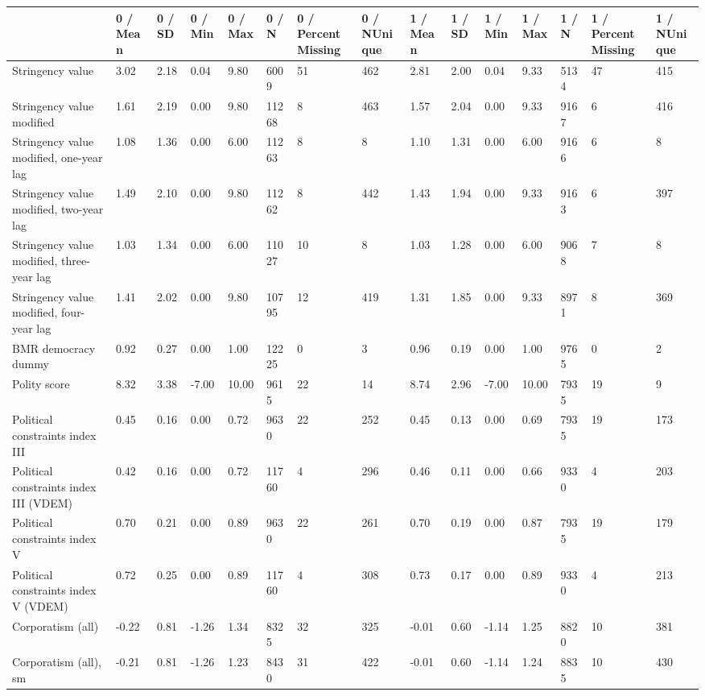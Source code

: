 
\begin{longtable}{lllllllllllllll}
\toprule
  & 0 / Mean & 0 / SD & 0 / Min & 0 / Max & 0 / N & 0 / PercentMissing & 0 / NUnique & 1 / Mean & 1 / SD & 1 / Min & 1 / Max & 1 / N & 1 / PercentMissing & 1 / NUnique\\
\midrule
Stringency value & 3.02 & 2.18 & 0.04 & 9.80 & 6009 & 51 & 462 & 2.81 & 2.00 & 0.04 & 9.33 & 5134 & 47 & 415\\
Stringency value modified & 1.61 & 2.19 & 0.00 & 9.80 & 11268 & 8 & 463 & 1.57 & 2.04 & 0.00 & 9.33 & 9167 & 6 & 416\\
Stringency value modified, one-year lag & 1.08 & 1.36 & 0.00 & 6.00 & 11263 & 8 & 8 & 1.10 & 1.31 & 0.00 & 6.00 & 9166 & 6 & 8\\
Stringency value modified, two-year lag & 1.49 & 2.10 & 0.00 & 9.80 & 11262 & 8 & 442 & 1.43 & 1.94 & 0.00 & 9.33 & 9163 & 6 & 397\\
Stringency value modified, three-year lag & 1.03 & 1.34 & 0.00 & 6.00 & 11027 & 10 & 8 & 1.03 & 1.28 & 0.00 & 6.00 & 9068 & 7 & 8\\
\addlinespace
Stringency value modified, four-year lag & 1.41 & 2.02 & 0.00 & 9.80 & 10795 & 12 & 419 & 1.31 & 1.85 & 0.00 & 9.33 & 8971 & 8 & 369\\
BMR democracy dummy & 0.92 & 0.27 & 0.00 & 1.00 & 12225 & 0 & 3 & 0.96 & 0.19 & 0.00 & 1.00 & 9765 & 0 & 2\\
Polity score & 8.32 & 3.38 & -7.00 & 10.00 & 9615 & 22 & 14 & 8.74 & 2.96 & -7.00 & 10.00 & 7935 & 19 & 9\\
Political constraints index III & 0.45 & 0.16 & 0.00 & 0.72 & 9630 & 22 & 252 & 0.45 & 0.13 & 0.00 & 0.69 & 7935 & 19 & 173\\
Political constraints index III (VDEM) & 0.42 & 0.16 & 0.00 & 0.72 & 11760 & 4 & 296 & 0.46 & 0.11 & 0.00 & 0.66 & 9330 & 4 & 203\\
\addlinespace
Political constraints index V & 0.70 & 0.21 & 0.00 & 0.89 & 9630 & 22 & 261 & 0.70 & 0.19 & 0.00 & 0.87 & 7935 & 19 & 179\\
Political constraints index V (VDEM) & 0.72 & 0.25 & 0.00 & 0.89 & 11760 & 4 & 308 & 0.73 & 0.17 & 0.00 & 0.89 & 9330 & 4 & 213\\
Corporatism (all) & -0.22 & 0.81 & -1.26 & 1.34 & 8325 & 32 & 325 & -0.01 & 0.60 & -1.14 & 1.25 & 8820 & 10 & 381\\
Corporatism (all), sm & -0.21 & 0.81 & -1.26 & 1.23 & 8430 & 31 & 422 & -0.01 & 0.60 & -1.14 & 1.24 & 8835 & 10 & 430\\

\end{longtable}
